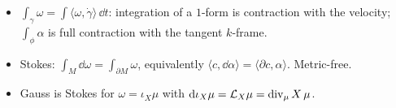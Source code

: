 \begin{keypoints}
\begin{itemize}
\item $\int_\gamma\omega=\int\langle\omega,\dot\gamma\rangle\,\dd t$: integration of a $1$-form is contraction with the velocity; $\int_\phi\alpha$ is full contraction with the tangent $k$-frame.
\item Stokes: $\int_M\dd\omega=\int_{\partial M}\omega$, equivalently $\langle c,\dd\alpha\rangle=\langle\partial c,\alpha\rangle$. Metric-free.
\item Gauss is Stokes for $\omega=\iota_X\mu$ with $\mathrm{d}\iota_X\mu=\mathcal{L}_X\mu=\operatorname{div}_\mu X\,\mu$.
\end{itemize}
\end{keypoints}
